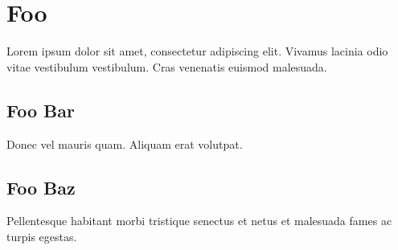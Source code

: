 \part{Foo}\label{foo}

Lorem ipsum dolor sit amet, consectetur adipiscing elit. Vivamus lacinia odio vitae vestibulum vestibulum. Cras venenatis euismod malesuada.

\chapter{Foo Bar}\label{foo-bar}

Donec vel mauris quam. Aliquam erat volutpat.

\chapter{Foo Baz}\label{foo-baz}

Pellentesque habitant morbi tristique senectus et netus et malesuada fames ac turpis egestas.
